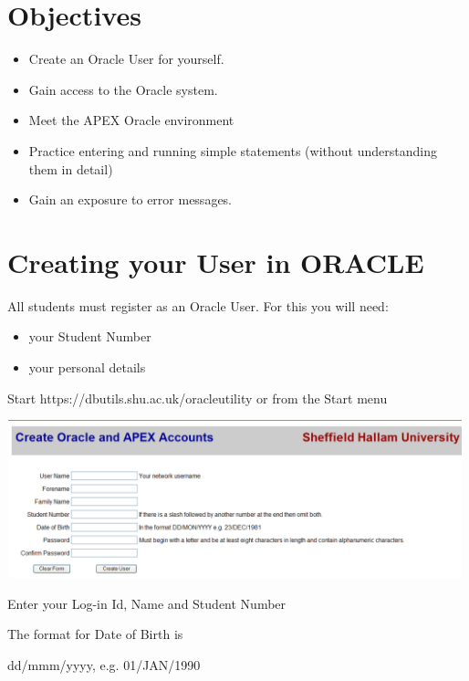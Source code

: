 \section{Objectives}
\begin{itemize}
\item Create an Oracle User for yourself.
\item Gain access to the Oracle system.
\item Meet the APEX Oracle environment 
\item Practice entering and running simple statements (without understanding them in detail)
\item Gain an exposure to error messages.
\end{itemize}
\section{Creating your User in ORACLE }
All students must register as an Oracle User.  For this you will need:

\begin{itemize}
\item your Student Number
\item your personal details
\end{itemize}
Start https://dbutils.shu.ac.uk/oracleutility  or from the Start menu



\begin{center}
  
\includegraphics[width=13.201cm,height=4.574cm]{images/img (3).png}

\end{center}
\begin{center}
\begin{minipage}{4.177cm}
Enter your Log-in Id, Name and Student Number
\end{minipage}
\end{center}


\begin{center}
\begin{minipage}{4.177cm}
The format for Date of Birth is

dd/mmm/yyyy, e.g. 01/JAN/1990
\end{minipage}
\end{center}


